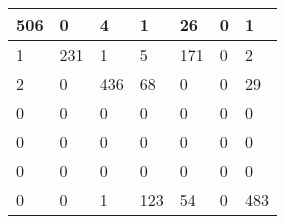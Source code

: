 \begin{tabular}{lllllll}
\hline
  506 & 0 & 4 & 1 & 26 & 0 & 1 \\
\hline
  1 & 231 & 1 & 5 & 171 & 0 & 2 \\
\hline
  2 & 0 & 436 & 68 & 0 & 0 & 29 \\
\hline
  0 & 0 & 0 & 0 & 0 & 0 & 0 \\
\hline
  0 & 0 & 0 & 0 & 0 & 0 & 0 \\
\hline
  0 & 0 & 0 & 0 & 0 & 0 & 0 \\
\hline
  0 & 0 & 1 & 123 & 54 & 0 & 483 \\
\hline
\end{tabular}
